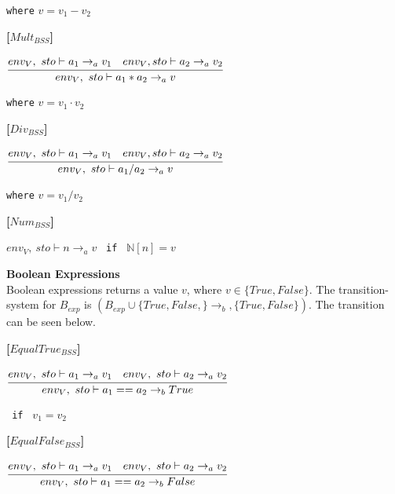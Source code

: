 {\begin{center}
	
	\texttt{where} $v = v_1 - v_2$
\end{center}

\textbf{[$Mult_{BSS}$]}\\
\begin{center}
	\begin{math}
	\cfrac
	{env_V,\ sto \vdash a_1 \rightarrow_a v_1 \quad env_V, sto \vdash a_2 \rightarrow_a v_2}
	{env_V,\ sto \vdash a_1 * a_2 \rightarrow_a v}
	\end{math}
	
	
	\texttt{where} $v = v_1 \cdot v_2$
\end{center}

\textbf{[$Div_{BSS}$]}\\
\begin{center}
	\begin{math}
	\cfrac
	{env_V,\ sto \vdash a_1 \rightarrow_a v_1 \quad env_V, sto \vdash a_2 \rightarrow_a v_2}
	{env_V,\ sto \vdash a_1 / a_2 \rightarrow_a v}
	\end{math}
	
	
	\texttt{where} $v = v_1 / v_2$
\end{center}

\textbf{[$Num_{BSS}$]}\\
\begin{center}
	\begin{math}
		env_V,\ sto \vdash n \rightarrow_a v
	\end{math}
	\texttt{ if } $\mathbb{N}[n] = v$
\end{center}

\textbf{\large{Boolean Expressions}}\\
Boolean expressions returns a value $v$, where $v \in \{True, False\}$.
The transition-system for $B_{exp}$ is $(B_{exp} \cup \{True, False,\} \rightarrow_b, \{True, False\})$.
The transition can be seen below.

\textbf{[$EqualTrue_{BSS}$]}\\
\begin{center}
	\begin{math}
		\cfrac
			{env_V,\ sto \vdash a_1 \rightarrow_a v_1 \quad env_V,\ sto \vdash a_2 \rightarrow_a v_2}
			{env_V,\ sto \vdash a_1 == a_2 \rightarrow_b True}
	\end{math}
	
	\texttt{ if } $v_1 = v_2$
\end{center}

\textbf{[$EqualFalse_{BSS}$]}\\
\begin{center}
	\begin{math}
	\cfrac
	{env_V,\ sto \vdash a_1 \rightarrow_a v_1 \quad env_V,\ sto \vdash a_2 \rightarrow_a v_2}
	{env_V,\ sto \vdash a_1 == a_2 \rightarrow_b False}
	\end{math}
	

\end{center}}
